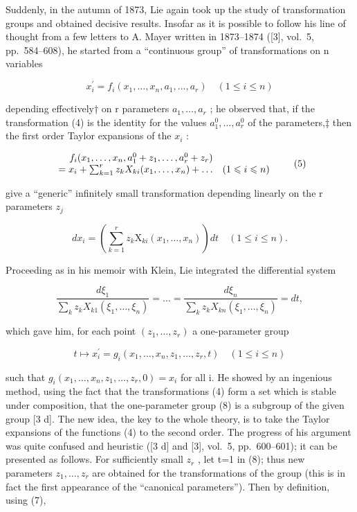 
Suddenly, in the autumn of 1873, Lie again took up the study of transformation groups and obtained decisive results. Insofar as it is possible to follow his line of thought from a few letters to A. Mayer written in 1873--1874 ({[}3{]}, vol.~5, pp.~584--608), he started from a ``continuous group'' of transformations on n variables

\[
x _ {i} ^ {\prime} = f _ {i} (x _ {1}, \dots , x _ {n}, a _ {1}, \dots , a _ {r}) \quad (1 \leqslant i \leqslant n)\tag{4}
\]

depending effectively† on r parameters \(a_{1},\ldots,a_{r}\) ; he observed that, if the transformation (4) is the identity for the values \(a_{1}^{0},\ldots,a_{r}^{0}\) of the parameters,‡ then the first order Taylor expansions of the \(x_{i}\) :

\[
\begin{array}{r l} f _ {i} (x _ {1}, \dots , x _ {n}, a _ {1} ^ {0} + z _ {1}, \dots , a _ {r} ^ {0} + z _ {r}) & \\ = x _ {i} + \sum_ {k = 1} ^ {r} z _ {k} X _ {k i} (x _ {1}, \dots , x _ {n}) + \dots & (1 \leqslant i \leqslant n) \end{array} \tag {5}
\]

give a ``generic'' infinitely small transformation depending linearly on the r parameters \(z_{j}\)

\[
d x _ {i} = \left(\sum_ {k = 1} ^ {r} z _ {k} \mathrm{X} _ {k i} (x _ {1}, \dots , x _ {n})\right) d t \quad (1 \leqslant i \leqslant n).\tag{6}
\]

Proceeding as in his memoir with Klein, Lie integrated the differential system

\[
\frac {d \xi_ {1}}{\sum_ {k} z _ {k} X _ {k 1} (\xi_ {1} , \dots , \xi_ {n})} = \dots = \frac {d \xi_ {n}}{\sum_ {k} z _ {k} X _ {k n} (\xi_ {1} , \dots , \xi_ {n})} = d t,\tag{7}
\]

which gave him, for each point \((z_{1},\ldots,z_{r})\) a one-parameter group

\[
t \mapsto x _ {i} ^ {\prime} = g _ {i} (x _ {1}, \dots , x _ {n}, z _ {1}, \dots , z _ {r}, t) \quad (1 \leqslant i \leqslant n)\tag{8}
\]

such that \(g_{i}(x_{1},\ldots,x_{n},z_{1},\ldots,z_{r},0)=x_{i}\) for all i. He showed by an ingenious method, using the fact that the transformations (4) form a set which is stable under composition, that the one-parameter group (8) is a subgroup of the given group {[}3 d{]}. The new idea, the key to the whole theory, is to take the Taylor expansions of the functions (4) to the second order. The progress of his argument was quite confused and heuristic ({[}3 d{]} and {[}3{]}, vol.~5, pp.~600--601); it can be presented as follows. For sufficiently small \(z_{r}\) , let t=1 in (8); thus new parameters \(z_{1},\ldots,z_{r}\) are obtained for the transformations of the group (this is in fact the first appearance of the ``canonical parameters''). Then by definition, using (7),

